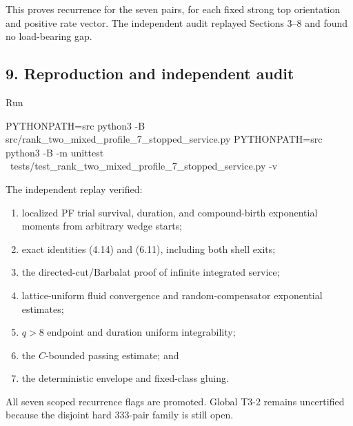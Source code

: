 This proves recurrence for the seven pairs, for each fixed strong top
orientation and positive rate vector. The independent audit replayed
Sections 3--8 and found no load-bearing gap.

\subsection{9. Reproduction and independent
audit}

Run

\begin{CodeBlock}
PYTHONPATH=src python3 -B src/rank_two_mixed_profile_7_stopped_service.py
PYTHONPATH=src python3 -B -m unittest \
  tests/test_rank_two_mixed_profile_7_stopped_service.py -v
\end{CodeBlock}

The independent replay verified:

\begin{enumerate}
\def\labelenumi{\arabic{enumi}.}
\tightlist
\item
  localized PF trial survival, duration, and compound-birth exponential
  moments from arbitrary wedge starts;
\item
  exact identities (4.14) and (6.11), including both shell exits;
\item
  the directed-cut/Barbalat proof of infinite integrated service;
\item
  lattice-uniform fluid convergence and random-compensator exponential
  estimates;
\item
  \(q>8\) endpoint and duration uniform integrability;
\item
  the \(C\)-bounded passing estimate; and
\item
  the deterministic envelope and fixed-class gluing.
\end{enumerate}

All seven scoped recurrence flags are promoted. Global T3-2 remains
uncertified because the disjoint hard 333-pair family is still open.
